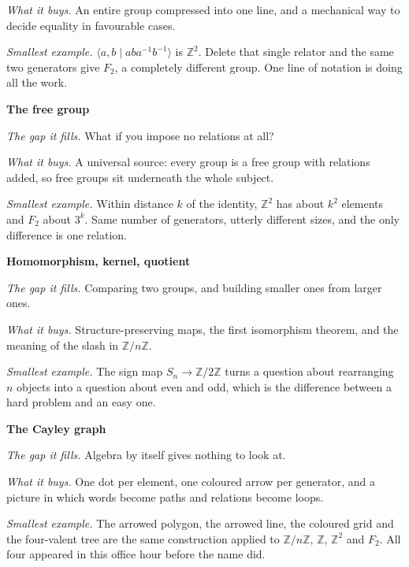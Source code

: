 \documentclass[10pt]{article}
\newcommand{\Z}{\mathbb{Z}}
\newcommand{\inv}{^{-1}}
\begin{document}
{\begin{minipage}[t]{744pt}
\begin{minipage}[t]{238pt}
\emph{What it buys.} An entire group compressed into one line, and a mechanical way to decide equality in favourable cases.\par\vspace{1pt}
\emph{Smallest example.} $\langle a,b \mid aba\inv b\inv\rangle$ is $\Z^2$. Delete that single relator and the same two generators give $F_2$, a completely different group. One line of notation is doing all the work.
\end{minipage}\hfill
\begin{minipage}[t]{238pt}\vspace{0pt}
{\sffamily\bfseries\color{big} The free group}\par\vspace{1pt}
\emph{The gap it fills.} What if you impose no relations at all?\par\vspace{1pt}
\emph{What it buys.} A universal source: every group is a free group with relations added, so free groups sit underneath the whole subject.\par\vspace{1pt}
\emph{Smallest example.} Within distance $k$ of the identity, $\Z^2$ has about $k^2$ elements and $F_2$ about $3^k$. Same number of generators, utterly different sizes, and the only difference is one relation.\par\vspace{5pt}
{\sffamily\bfseries\color{big} Homomorphism, kernel, quotient}\par\vspace{1pt}
\emph{The gap it fills.} Comparing two groups, and building smaller ones from larger ones.\par\vspace{1pt}
\emph{What it buys.} Structure-preserving maps, the first isomorphism theorem, and the meaning of the slash in $\Z/n\Z$.\par\vspace{1pt}
\emph{Smallest example.} The sign map $S_n\to\Z/2\Z$ turns a question about rearranging $n$ objects into a question about even and odd, which is the difference between a hard problem and an easy one.\par\vspace{5pt}
{\sffamily\bfseries\color{big} The Cayley graph}\par\vspace{1pt}
\emph{The gap it fills.} Algebra by itself gives nothing to look at.\par\vspace{1pt}
\emph{What it buys.} One dot per element, one coloured arrow per generator, and a picture in which words become paths and relations become loops.\par\vspace{1pt}
\emph{Smallest example.} The arrowed polygon, the arrowed line, the coloured grid and the four-valent tree are the same construction applied to $\Z/n\Z$, $\Z$, $\Z^2$ and $F_2$. All four appeared in this office hour before the name did.
\end{minipage}
\end{minipage}
}
\end{document}
